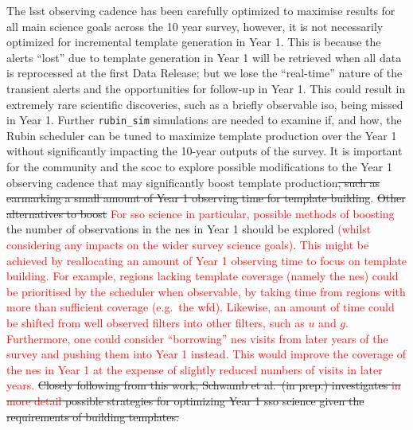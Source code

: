 \documentclass[preprintm,linenumbers]{aastex631}
\newcommand{\rubinsim}{\texttt{rubin\_sim}\xspace}
\providecommand{\red}[1]{\textcolor{red}{#1}}
\begin{document}
The \gls*{lsst} observing cadence has been carefully optimized to maximise results for all main science goals across the 10 year survey, however, it is not necessarily optimized for incremental template generation in Year 1.
  This is because the alerts ``lost'' due to template generation in Year 1 will be retrieved when all data is reprocessed at the first Data Release; but we lose the ``real-time'' nature of the transient alerts and the opportunities for follow-up in Year 1.
This could result in extremely rare scientific discoveries, such as a briefly observable \gls*{iso}, being missed in Year 1.
		Further \rubinsim simulations are needed to examine if, and how, the Rubin scheduler can be tuned to maximize template production over the Year 1 without significantly impacting the 10-year outputs of the survey. 
  It is important for the community and the \gls*{scoc} to explore possible modifications to the Year 1 observing cadence  that may significantly boost template production\sout{, such as earmarking a small amount of Year 1 observing time for template building}. 
\sout{Other alternatives to boost} \red{For \gls*{sso} science in particular, possible methods of boosting} the number of observations in the \gls*{nes} in Year 1 should be explored \red{(whilst considering any impacts on the wider survey science goals)}. 
  \red{
  This might be achieved by reallocating an amount of Year 1 observing time to focus on template building.} 
 \red{For example, regions lacking template coverage (namely the \gls*{nes}) could be prioritised by the scheduler when observable, by taking time from regions with more than sufficient coverage (e.g.\ the \gls*{wfd}). 
  Likewise, an amount of time could be shifted from well observed filters into other filters, such as $u$ and $g$.}
\red{Furthermore, one could consider ``borrowing'' \gls*{nes} visits from later years of the survey and pushing them into Year 1 instead.
  This would improve the coverage of the \gls*{nes} in Year 1 at the expense of slightly reduced numbers of visits in later years.}
\sout{Closely following from this work, Schwamb et al.\ (in prep.) investigates \red{in more detail} possible strategies for optimizing Year 1 \gls*{sso} science given the requirements of building templates.}
\end{document}
